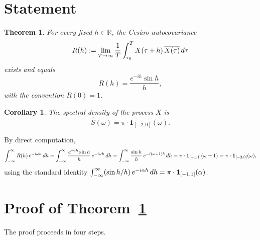 \documentclass{article}
\newcommand{\assign}{:=}
\newtheorem{corollary}{Corollary}
\newtheorem{theorem}{Theorem}
\begin{document}
\section{Statement}

\begin{theorem}
  \label{thm:cov}For every fixed $h \in \mathbb{R}$, the Ces{\`a}ro
  autocovariance
  \begin{equation}
    \label{eq:Rdef} R (h) \assign \lim_{T \to \infty}  \frac{1}{T} 
    \int_{\tau_0}^T X (\tau + h) \hspace{0.17em} \overline{X (\tau)}
    \hspace{0.17em} d \tau
  \end{equation}
  exists and equals
  \begin{equation}
    \label{eq:Rvalue} R (h) = \frac{e^{- ih} \sin h}{h},
  \end{equation}
  with the convention $R (0) = 1$.
\end{theorem}

\begin{corollary}
  \label{cor:spectral}The spectral density of the process $X$ is
  \[ \hat{S} (\omega) = \pi \cdot \textbf{1}_{[- 2, 0]} (\omega) . \]
\end{corollary}

By direct computation,
\[ \int_{- \infty}^{\infty} R (h)  \hspace{0.17em} e^{- i \omega h} 
   \hspace{0.17em} dh = \int_{- \infty}^{\infty} \frac{e^{- ih} \sin h}{h} 
   \hspace{0.17em} e^{- i \omega h}  \hspace{0.17em} dh = \int_{-
   \infty}^{\infty} \frac{\sin h}{h}  \hspace{0.17em} e^{- i (\omega + 1) h} 
   \hspace{0.17em} dh = \pi \cdot \textbf{1}_{[- 1, 1]}  (\omega + 1) = \pi
   \cdot \textbf{1}_{[- 2, 0]} (\omega), \]
using the standard identity $\int_{- \infty}^{\infty} (\sin h / h) 
\hspace{0.17em} e^{- i \alpha h}  \hspace{0.17em} dh = \pi \cdot
\textbf{1}_{[- 1, 1]} (\alpha)$.

\section{Proof of Theorem~\ref{thm:cov}}

The proof proceeds in four steps.
\end{document}
